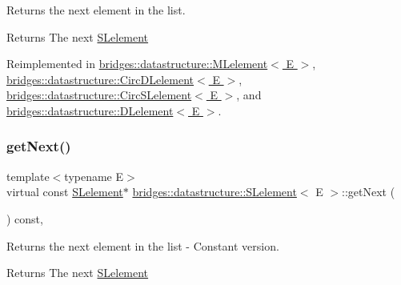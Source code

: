 Returns the next element in the list. 

\begin{DoxyReturn}{Returns}
The next \hyperlink{classbridges_1_1datastructure_1_1_s_lelement}{S\+Lelement} 
\end{DoxyReturn}


Reimplemented in \hyperlink{classbridges_1_1datastructure_1_1_m_lelement_a47b417db0b948b6899eece572bef9274}{bridges\+::datastructure\+::\+M\+Lelement$<$ E $>$}, \hyperlink{classbridges_1_1datastructure_1_1_circ_d_lelement_a80681d0382643a6df21da1bec4067004}{bridges\+::datastructure\+::\+Circ\+D\+Lelement$<$ E $>$}, \hyperlink{classbridges_1_1datastructure_1_1_circ_s_lelement_aff77056ace1361a35a09dc006eba34a3}{bridges\+::datastructure\+::\+Circ\+S\+Lelement$<$ E $>$}, and \hyperlink{classbridges_1_1datastructure_1_1_d_lelement_a63212051ea77d74bd751dea00288d2be}{bridges\+::datastructure\+::\+D\+Lelement$<$ E $>$}.

\mbox{\label{classbridges_1_1datastructure_1_1_s_lelement_a8c62cb82fa64bbfe9ebb7334a5fea417}} 
\subsubsection{\texorpdfstring{get\+Next()}{getNext()}\hspace{0.1cm}{\footnotesize\ttfamily [2/2]}}
{\footnotesize\ttfamily template$<$typename E$>$ \\
virtual const \hyperlink{classbridges_1_1datastructure_1_1_s_lelement}{S\+Lelement}$\ast$ \hyperlink{classbridges_1_1datastructure_1_1_s_lelement}{bridges\+::datastructure\+::\+S\+Lelement}$<$ E $>$\+::get\+Next (\begin{DoxyParamCaption}{ }\end{DoxyParamCaption}) const\hspace{0.3cm}{\ttfamily [inline]}, {\ttfamily [virtual]}}



Returns the next element in the list -\/ Constant version. 

\begin{DoxyReturn}{Returns}
The next \hyperlink{classbridges_1_1datastructure_1_1_s_lelement}{S\+Lelement} 
\end{DoxyReturn}


